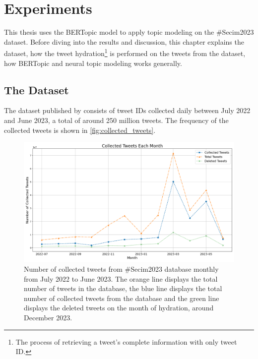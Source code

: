 
\chapter{Experiments}\label{chapter:experiments}

This thesis uses the BERTopic model to apply topic modeling on the \#Secim2023 dataset. 
Before diving into the results and discussion, this chapter explains the dataset, 
how the tweet hydration\footnote{The process of retrieving a tweet's complete information
with only tweet ID.} is performed on the tweets from the dataset, how BERTopic and 
neural topic modeling works generally.

\section{The Dataset}

The dataset published by \textcite{secim2023} consists of tweet IDs collected daily 
between July 2022 and June 2023, a total of around 250 million tweets. 
The frequency of the collected tweets is shown in \autoref{fig:collected_tweets}.

\begin{figure}[htb]
    \centering
    \includegraphics[width=\linewidth]{figures/collected_tweets_2.png}
    \caption[Collected Tweets each month]
    {Number of collected tweets from \#Secim2023 database monthly from July 2022 to June 2023.
    The orange line displays the total number of tweets in the database, 
    the blue line displays the total number of collected tweets from the database and 
    the green line displays the deleted tweets on the month of hydration, around
    December 2023.}\label{fig:collected_tweets}
\end{figure}

